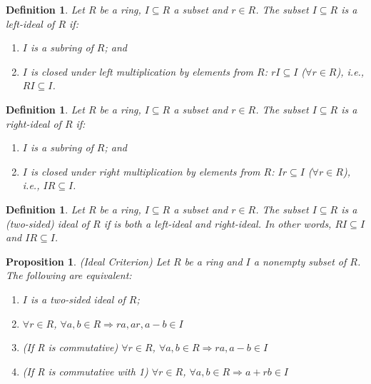 \documentclass[a4paper,sfsidenotes,openany]{tufte-book}
\theoremstyle{theorem}
\newtheorem{proposition}[theorem]{Proposition}
\newtheorem{definition}[theorem]{Definition}
\begin{document}
\begin{fullwidth}
\begin{definition}
Let $R$ be a ring, $I \subseteq R$ a subset and $r \in R$. The subset $I \subseteq R$ is a \textit{{\color{blue} left-ideal}} of $R$ if:
\begin{enumerate}[label=(\roman*),leftmargin=0pt, itemindent=4em, align=left]
\item $I$ is a subring of $R$; and
\item $I$ is closed under left multiplication by elements from $R$: $rI \subseteq I$ ($\forall r \in R$), i.e., $RI \subseteq I$.
\end{enumerate}
\end{definition}
\>

\begin{definition}
Let $R$ be a ring, $I \subseteq R$ a subset and $r \in R$. The subset $I \subseteq R$ is a \textit{{\color{blue} right-ideal}} of $R$ if:
\begin{enumerate}[label=(\roman*),leftmargin=0pt, itemindent=4em, align=left]
\item $I$ is a subring of $R$; and
\item $I$ is closed under right multiplication by elements from $R$: $Ir \subseteq I$ ($\forall r \in R$), i.e., $IR \subseteq I$.
\end{enumerate}
\end{definition}
\>

\begin{definition}
Let $R$ be a ring, $I \subseteq R$ a subset and $r \in R$. The subset $I \subseteq R$ is a \textit{{\color{blue} (two-sided) ideal}} of $R$ if is both a left-ideal and right-ideal. In other words, $RI \subseteq I$ and $IR \subseteq I$.
\end{definition}
\>

\begin{proposition}
\textit{{\color{blue} (Ideal Criterion)}} Let $R$ be a ring and $I$ a nonempty subset of $R$. The following are equivalent:
\begin{enumerate}[label=(\roman*),leftmargin=0pt, itemindent=4em, align=left]
\item $I$ is a two-sided ideal of $R$;
\item $\forall r \in R$, $\forall a, b \in R \Rightarrow ra, ar, a-b \in I$
\item (If R is commutative) $\forall r \in R$, $\forall a, b \in R \Rightarrow ra, a-b \in I$
\item (If R is commutative with 1) $\forall r \in R$, $\forall a, b \in R \Rightarrow a+rb \in I$
\end{enumerate}
\end{proposition}
\>


\end{fullwidth}
\end{document}
